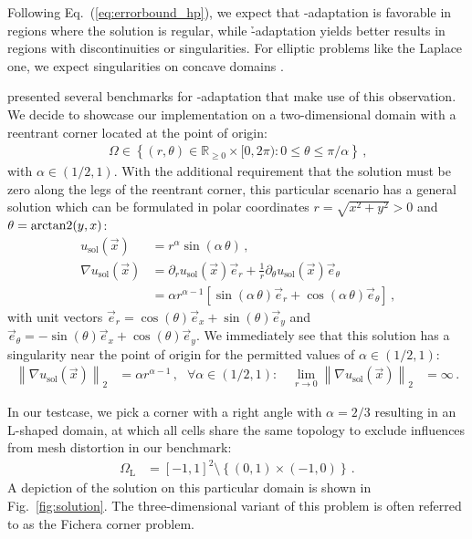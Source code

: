 Following Eq.~(\ref{eq:errorbound_hp}), we expect that \p-adaptation is favorable in regions where the solution is regular, while \h-adaptation yields better results in regions with discontinuities or singularities. For elliptic problems like the Laplace one, we expect singularities on concave domains \parencite[Sec.~5.5]{brenner2008}.

\textcite{mitchell2014} presented several benchmarks for \hp-\linebreak{}adaptation that make use of this observation. We decide to showcase our implementation on a two-dimensional domain with a reentrant corner located at the point of origin:
\begin{align}
\Omega \in \left\{ (r,\theta) \in \mathbb{R}_{\geq 0} \times [0, 2 \pi) : 0 \leq \theta \leq \pi/\alpha \right\} \,\text{,}
\end{align}
with $\alpha \in \left(1/2, 1\right)$. With the additional requirement that the solution must be zero along the legs of the reentrant corner, this particular scenario has a general solution which can be formulated in polar coordinates $r = \sqrt{x^2 + y^2} > 0$ and $\theta = \operatorname{arctan2}(y,x)$:
\begin{align}
\label{eq:ficherasolution} u_\text{sol}(\vec{x}) &= r^\alpha \sin(\alpha \, \theta) \,\text{,} \\
\nabla u_\text{sol}(\vec{x}) &= \partial_r u_\text{sol}(\vec{x}) \vec{e}_r + \frac{1}{r} \partial_\theta u_\text{sol}(\vec{x}) \vec{e}_\theta \\
&= \alpha r^{\alpha - 1} \left[ \sin(\alpha \, \theta) \vec{e}_r + \cos(\alpha \, \theta) \vec{e}_\theta \right] \,\text{,}
\end{align}
with unit vectors \(\vec{e}_r = \cos(\theta) \vec{e}_x + \sin(\theta) \vec{e}_y\) and \(\vec{e}_\theta = - \sin(\theta) \vec{e}_x + \cos(\theta) \vec{e}_y\). We immediately see that this solution has a singularity near the point of origin for the permitted values of $\alpha \in \left(1/2, 1\right)$:
\begin{align}
\left\| \nabla u_\text{sol}(\vec{x}) \right\|_{2} &= \alpha r^{\alpha - 1} \,\text{,} & \forall \alpha \in \left(1/2, 1\right) : \quad \lim\limits_{r \rightarrow 0} \left\| \nabla u_\text{sol}(\vec{x}) \right\|_{2} &= \infty \,\text{.}
\end{align}

In our testcase, we pick a corner with a right angle with $\alpha = 2/3$ resulting in an L-shaped domain, at which all cells share the same topology to exclude influences from mesh distortion in our benchmark:
\begin{align}
\label{eq:Ldomain} \Omega_\text{L} &= \left[-1,1\right]^2 \setminus \left\{ \left(0,1\right) \times \left(-1, 0\right) \right\} \,\text{.}
\end{align}
A depiction of the solution on this particular domain is shown in Fig.~\ref{fig:solution}. The three-dimensional variant of this problem is often referred to as the Fichera corner problem.

